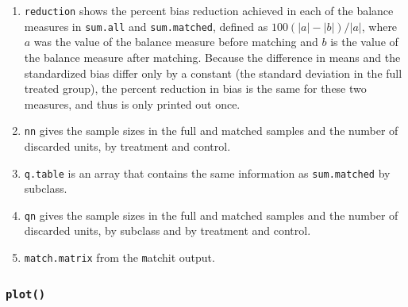 \documentclass[oneside,letterpaper,titlepage]{article}
\begin{document}
\begin{enumerate}
\item \texttt{reduction} shows the percent bias reduction achieved in
  each of the balance measures in \texttt{sum.all} and
  \texttt{sum.matched}, defined as $100(|a|-|b|)/|a|$, where $a$ was
  the value of the balance measure before matching and $b$ is the
  value of the balance measure after matching.  Because the difference
  in means and the standardized bias differ only by a constant (the
  standard deviation in the full treated group), the percent reduction
  in bias is the same for these two measures, and thus is only printed
  out once.

\item \texttt{nn} gives the sample sizes in the full and matched
  samples and the number of discarded units, by treatment and control.
  
\item \texttt{q.table} is an array that contains the same information
  as \texttt{sum.matched} by subclass.
  
\item \texttt{qn} gives the sample sizes in the full and matched
  samples and the number of discarded units, by subclass and by
  treatment and control.
\item \texttt{match.matrix} from the {\texttt matchit} output.
\end{enumerate}

\subsubsection{{\tt plot()}}
\end{document}

